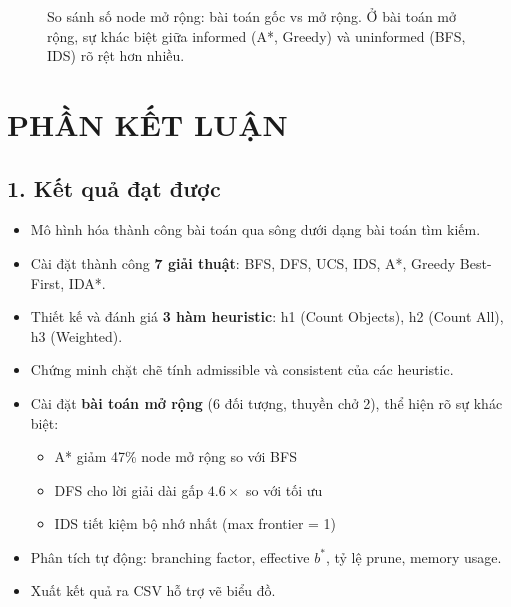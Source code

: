 \documentclass[a4paper,12pt]{article}
\begin{document}
\begin{figure}[H]
\centering
{}
\caption{So sánh số node mở rộng: bài toán gốc vs mở rộng. Ở bài toán mở rộng, sự khác biệt giữa informed (A*, Greedy) và uninformed (BFS, IDS) rõ rệt hơn nhiều.}
\label{fig:compare_orig_ext}
\end{figure}

\section*{PHẦN KẾT LUẬN}

\subsection*{1. Kết quả đạt được}

\begin{itemize}
    \item Mô hình hóa thành công bài toán qua sông dưới dạng bài toán tìm kiếm.
    \item Cài đặt thành công \textbf{7 giải thuật}: BFS, DFS, UCS, IDS, A*, Greedy Best-First, IDA*.
    \item Thiết kế và đánh giá \textbf{3 hàm heuristic}: h1 (Count Objects), h2 (Count All), h3 (Weighted).
    \item Chứng minh chặt chẽ tính admissible và consistent của các heuristic.
    \item Cài đặt \textbf{bài toán mở rộng} (6 đối tượng, thuyền chở 2), thể hiện rõ sự khác biệt:
    \begin{itemize}
        \item A* giảm 47\% node mở rộng so với BFS
        \item DFS cho lời giải dài gấp $4.6\times$ so với tối ưu
        \item IDS tiết kiệm bộ nhớ nhất (max frontier = 1)
    \end{itemize}
    \item Phân tích tự động: branching factor, effective $b^*$, tỷ lệ prune, memory usage.
    \item Xuất kết quả ra CSV hỗ trợ vẽ biểu đồ.
\end{itemize}
\end{document}
